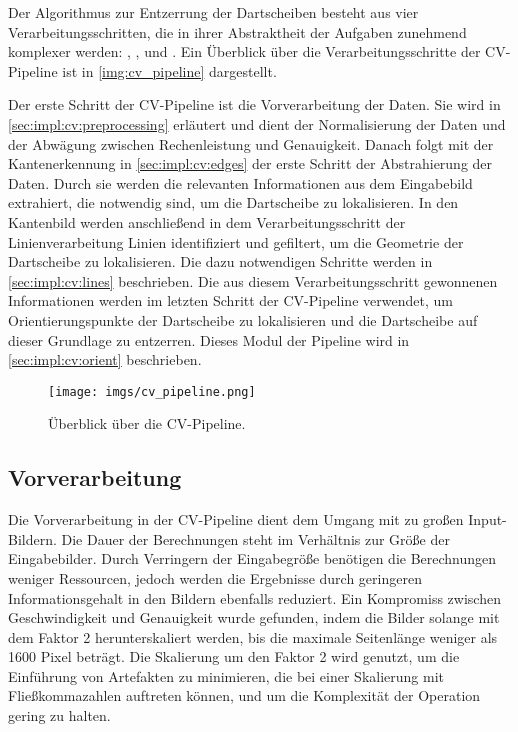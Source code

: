 Der Algorithmus zur Entzerrung der Dartscheiben besteht aus vier Verarbeitungsschritten, die in ihrer Abstraktheit der Aufgaben zunehmend komplexer werden: , ,  und . Ein Überblick über die Verarbeitungsschritte der CV-Pipeline ist in \autoref{img:cv_pipeline} dargestellt.

Der erste Schritt der CV-Pipeline ist die Vorverarbeitung der Daten. Sie wird in \autoref{sec:impl:cv:preprocessing} erläutert und dient der Normalisierung der Daten und der Abwägung zwischen Rechenleistung und Genauigkeit. Danach folgt mit der Kantenerkennung in \autoref{sec:impl:cv:edges} der erste Schritt der Abstrahierung der Daten. Durch sie werden die relevanten Informationen aus dem Eingabebild extrahiert, die notwendig sind, um die Dartscheibe zu lokalisieren. In den Kantenbild werden anschließend in dem Verarbeitungsschritt der Linienverarbeitung Linien identifiziert und gefiltert, um die Geometrie der Dartscheibe zu lokalisieren. Die dazu notwendigen Schritte werden in \autoref{sec:impl:cv:lines} beschrieben. Die aus diesem Verarbeitungsschritt gewonnenen Informationen werden im letzten Schritt der CV-Pipeline verwendet, um Orientierungspunkte der Dartscheibe zu lokalisieren und die Dartscheibe auf dieser Grundlage zu entzerren. Dieses Modul der Pipeline wird in \autoref{sec:impl:cv:orient} beschrieben.

\begin{figure}
    \centering
    \texttt{[image: imgs/cv\_pipeline.png]}
    \caption{Überblick über die CV-Pipeline.}
    \label{img:cv_pipeline}
\end{figure}


\subsection{Vorverarbeitung}
\label{sec:impl:cv:preprocessing}

Die Vorverarbeitung in der CV-Pipeline dient dem Umgang mit zu großen Input-Bildern. Die Dauer der Berechnungen steht im Verhältnis zur Größe der Eingabebilder. Durch Verringern der Eingabegröße benötigen die Berechnungen weniger Ressourcen, jedoch werden die Ergebnisse durch geringeren Informationsgehalt in den Bildern ebenfalls reduziert. Ein Kompromiss zwischen Geschwindigkeit und Genauigkeit wurde gefunden, indem die Bilder solange mit dem Faktor 2 herunterskaliert werden, bis die maximale Seitenlänge weniger als 1600 Pixel beträgt. Die Skalierung um den Faktor 2 wird genutzt, um die Einführung von Artefakten zu minimieren, die bei einer Skalierung mit Fließkommazahlen auftreten können, und um die Komplexität der Operation gering zu halten.

